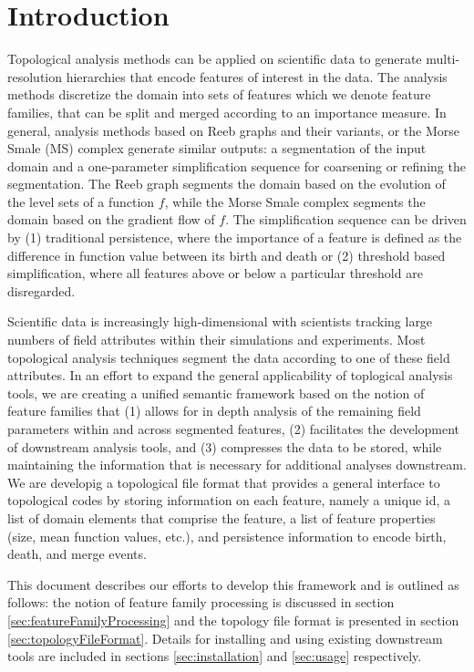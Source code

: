\section{Introduction} \label{sec:introduction}
Topological analysis methods can be applied on scientific data to generate
multi-resolution hierarchies that encode features of interest in the data.
The analysis methods discretize the domain into sets of features 
which we denote feature families, that can be split and merged according to
an importance measure.  In general, analysis methods based on Reeb graphs 
and their variants, or the Morse Smale (MS) complex generate similar outputs: 
a segmentation of the input domain and a one-parameter simplification sequence 
for coarsening or refining the segmentation.  The Reeb graph segments the domain 
based on the evolution of the level sets of a function $f$, while the Morse Smale 
complex segments the domain based on the gradient flow of $f$.  The simplification 
sequence can be driven by (1) traditional persistence, where the importance of a 
feature is defined as the difference in function value between its birth and 
death or (2) threshold based simplification, where all features above or below 
a particular threshold are disregarded.

Scientific data is increasingly high-dimensional with scientists tracking large
numbers of field attributes within their simulations and experiments.  Most
topological analysis techniques segment the data according to one of these
field attributes.  In an effort to expand the general applicability of 
toplogical analysis tools, we are creating a unified semantic framework based on
the notion of feature families that (1) allows for in depth analysis of the 
remaining field parameters within and across segmented features, (2) facilitates 
the development of downstream analysis tools, and (3) compresses
the data to be stored, while maintaining the information that is necessary for 
additional analyses downstream.  We are developig a topological file format that 
provides a general interface to topological codes by storing information on each 
feature, namely a unique id, a list of domain elements that comprise the feature, 
a list of feature properties (size, mean function values, etc.), and persistence
information to encode birth, death, and merge events.

This document describes our efforts to develop this framework and is outlined as 
follows:  the notion of feature family processing is discussed in section 
\ref{sec:featureFamilyProcessing} and the  topology file format is presented in 
section \ref{sec:topologyFileFormat}.  Details for installing and using existing 
downstream tools are included in sections \ref{sec:installation} and \ref{sec:usage} 
respectively.

